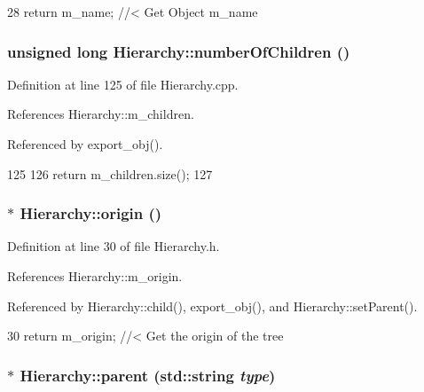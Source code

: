 \begin{DoxyCode}
28 { return m_name; } //< Get Object m_name
\end{DoxyCode}
\hypertarget{classHierarchy_ab16e84de65fd84e14001a6cf941c8be4}{
\subsubsection[{numberOfChildren}]{\setlength{\rightskip}{0pt plus 5cm}unsigned long Hierarchy::numberOfChildren ()}}
\label{classHierarchy_ab16e84de65fd84e14001a6cf941c8be4}


Definition at line 125 of file Hierarchy.cpp.

References Hierarchy::m\_\-children.

Referenced by export\_\-obj().


\begin{DoxyCode}
125                                            {
126   return m_children.size();
127 }
\end{DoxyCode}
\hypertarget{classHierarchy_aee461dc930ce3871636ff87f075b1b83}{
\subsubsection[{origin}]{$\ast$ Hierarchy::origin ()}}
\label{classHierarchy_aee461dc930ce3871636ff87f075b1b83}


Definition at line 30 of file Hierarchy.h.

References Hierarchy::m\_\-origin.

Referenced by Hierarchy::child(), export\_\-obj(), and Hierarchy::setParent().


\begin{DoxyCode}
30 { return m_origin; }  //< Get the origin of the tree
\end{DoxyCode}
\hypertarget{classHierarchy_ad550588733bf75ac5c0fcfd7c8fd11a6}{
\subsubsection[{parent}]{ $\ast$ Hierarchy::parent (std::string {\em type})}}
\label{classHierarchy_ad550588733bf75ac5c0fcfd7c8fd11a6}


